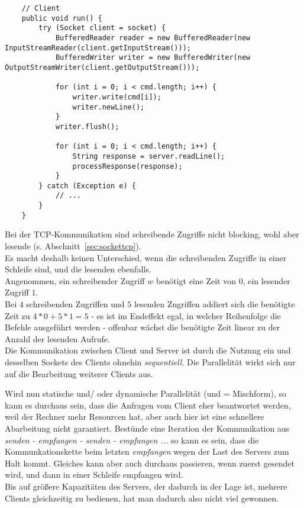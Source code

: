 \begin{verbatim}
    // Client
    public void run() {
        try (Socket client = socket) {
            BufferedReader reader = new BufferedReader(new InputStreamReader(client.getInputStream()));
            BufferedWriter writer = new BufferedWriter(new OutputStreamWriter(client.getOutputStream()));

            for (int i = 0; i < cmd.length; i++) {
                writer.write(cmd[i]);
                writer.newLine();
            }
            writer.flush();

            for (int i = 0; i < cmd.length; i++) {
                String response = server.readLine();
                processResponse(response);
            }
        } catch (Exception e) {
            // ...
        }
    }
\end{verbatim}

Bei der TCP-Kommunikation sind schreibende Zugriffe nicht blocking, wohl aber lesende (s. Abschnitt~\ref{sec:sockettcp}).\\
Es macht deshalb keinen Unterschied, wenn die schreibenden Zugriffe in einer Schleife sind, und die lesenden ebenfalls.\\
Angenommen, ein schreibender Zugriff $w$ benötigt eine Zeit von $0$, ein lesender Zugriff $1$.\\
Bei $4$ schreibenden Zugriffen und $5$ lesenden Zugriffen addiert sich die benötigte Zeit zu $4*0 + 5*1 = 5$ - es ist im Endeffekt egal, in welcher Reihenfolge die Befehle ausgeführt werden - offenbar wächst die benötigte Zeit linear zu der Anzahl der lesenden Aufrufe.\\
Die Kommunikation zwischen Client und Server ist durch die Nutzung ein und desselben Sockets des Clients ohnehin \textit{sequentiell}.
Die Parallelität wirkt sich nur auf die Bearbeitung weiterer Clients aus.


\noindent
Wird nun statische und/ oder dynamische Parallelität (und = Mischform), so kann es durchaus sein, dass die Anfragen vom Client eher beantwortet werden, weil der Rechner mehr Resourcen hat, aber auch hier ist eine schnellere Abarbeitung nicht garantiert.
Bestünde eine Iteration der Kommunikation aus \textit{senden - empfangen - senden - empfangen ...} so kann es sein, dass die Kommunkationskette beim letzten \textit{empfangen} wegen der Last des Servers zum Halt kommt.
Gleiches kann aber auch durchaus passieren, wenn zuerst gesendet wird, und dann in einer Schleife empfangen wird.\\
Bis auf größere Kapazitäten des Servers, der dadurch in der Lage ist, mehrere Clients gleichzeitig zu bedienen, hat man dadurch also nicht viel gewonnen.

